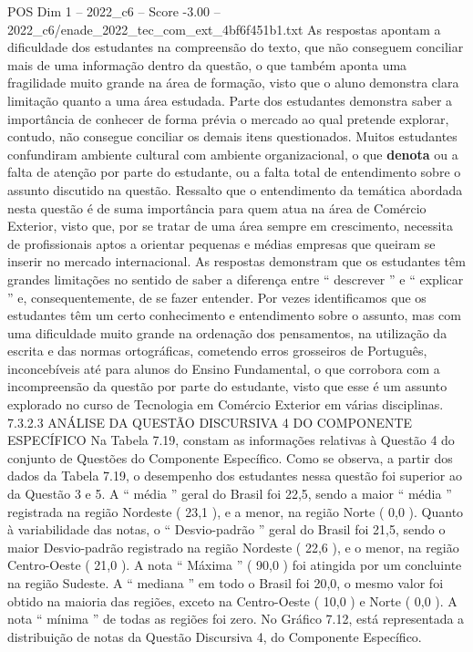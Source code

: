 \begin{textsample}{POS Dim 1 – 2022\_c6 – Score -3.00 – 2022\_c6/enade\_2022\_tec\_com\_ext\_4bf6f451b1.txt}
As respostas apontam a dificuldade dos estudantes na compreensão do texto, que não conseguem conciliar mais de uma informação dentro da questão, o que também aponta uma fragilidade muito grande na área de formação, visto que o aluno demonstra clara limitação quanto a uma área estudada.
Parte dos estudantes demonstra saber a importância de conhecer de forma prévia o mercado ao qual pretende explorar, contudo, não consegue conciliar os demais itens questionados.
Muitos estudantes confundiram ambiente cultural com ambiente organizacional, o que \textbf{denota} ou a falta de atenção por parte do estudante, ou a falta total de entendimento sobre o assunto discutido na questão.
Ressalto que o entendimento da temática abordada nesta questão é de suma importância para quem atua na área de Comércio Exterior, visto que, por se tratar de uma área sempre em crescimento, necessita de profissionais aptos a orientar pequenas e médias empresas que queiram se inserir no mercado internacional.
As respostas demonstram que os estudantes têm grandes limitações no sentido de saber a diferença entre “ descrever ” e “ explicar ” e, consequentemente, de se fazer entender.
Por vezes identificamos que os estudantes têm um certo conhecimento e entendimento sobre o assunto, mas com uma dificuldade muito grande na ordenação dos pensamentos, na utilização da escrita e das normas ortográficas, cometendo erros grosseiros de Português, inconcebíveis até para alunos do Ensino Fundamental, o que corrobora com a incompreensão da questão por parte do estudante, visto que esse é um assunto explorado no curso de Tecnologia em Comércio Exterior em várias disciplinas. 7.3.2.3 ANÁLISE DA QUESTÃO DISCURSIVA 4 DO COMPONENTE ESPECÍFICO Na Tabela 7.19, constam as informações relativas à Questão 4 do conjunto de Questões do Componente Específico.
Como se observa, a partir dos dados da Tabela 7.19, o desempenho dos estudantes nessa questão foi superior ao da Questão 3 e 5.
A “ média ” geral do Brasil foi 22,5, sendo a maior “ média ” registrada na região Nordeste ( 23,1 ), e a menor, na região Norte ( 0,0 ).
Quanto à variabilidade das notas, o “ Desvio-padrão ” geral do Brasil foi 21,5, sendo o maior Desvio-padrão registrado na região Nordeste ( 22,6 ), e o menor, na região Centro-Oeste ( 21,0 ).
A nota “ Máxima ” ( 90,0 ) foi atingida por um concluinte na região Sudeste.
A “ mediana ” em todo o Brasil foi 20,0, o mesmo valor foi obtido na maioria das regiões, exceto na Centro-Oeste ( 10,0 ) e Norte ( 0,0 ).
A nota “ mínima ” de todas as regiões foi zero.
No Gráfico 7.12, está representada a distribuição de notas da Questão Discursiva 4, do Componente Específico.

\end{textsample}
